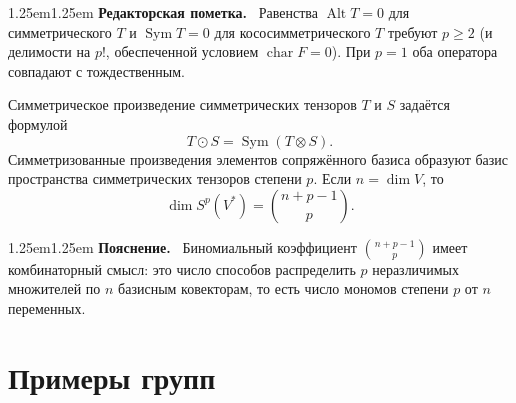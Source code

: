 \documentclass[12pt,a4paper,oneside,openany]{book}
\theoremstyle{definition}
\theoremstyle{plain}
\theoremstyle{remark}
\newenvironment{explanation}
  {\begin{adjustwidth}{1.25em}{1.25em}\small
   \noindent\textcolor{logicteal}{\sffamily\bfseries Пояснение.}\ }
  {\par\end{adjustwidth}}
\newenvironment{editorialnote}
  {\begin{adjustwidth}{1.25em}{1.25em}\small
   \noindent\textcolor{editorred}{\sffamily\bfseries Редакторская пометка.}\ }
  {\par\end{adjustwidth}}
\begin{document}
\begin{editorialnote}
Равенства $\operatorname{Alt}T=0$ для симметрического $T$ и
$\operatorname{Sym}T=0$ для кососимметрического $T$ требуют $p\ge2$
(и делимости на $p!$, обеспеченной условием
$\operatorname{char}F=0$). При $p=1$ оба оператора совпадают с
тождественным.
\end{editorialnote}

Симметрическое произведение симметрических тензоров $T$ и $S$ задаётся
формулой
\[
  T\odot S=\operatorname{Sym}(T\otimes S).
\]
Симметризованные произведения элементов сопряжённого базиса образуют
базис пространства симметрических тензоров степени $p$. Если
$n=\dim V$, то
\[
  \dim S^p(V^*)=\binom{n+p-1}{p}.
\]

\begin{explanation}
Биномиальный коэффициент $\binom{n+p-1}{p}$ имеет комбинаторный смысл:
это число способов распределить $p$ неразличимых множителей по $n$
базисным ковекторам, то есть число мономов степени $p$ от $n$
переменных.
\end{explanation}


\chapter*{Примеры групп}
\end{document}
